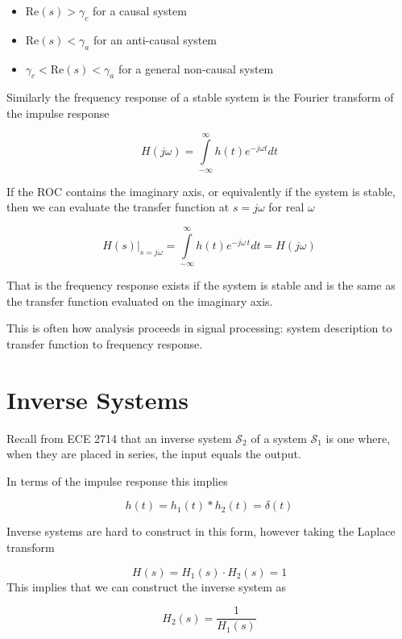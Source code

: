 \documentclass{article}
\begin{document}
\begin{itemize}
\item $\text{Re}(s) > \gamma_c$ for a causal system
\item $\text{Re}(s) < \gamma_a$ for an anti-causal system
\item $\gamma_c < \text{Re}(s) < \gamma_a$ for a general non-causal system 
\end{itemize}

Similarly the frequency response of a stable system is the Fourier transform of the impulse response

$$
H(j\omega) = \int\limits_{-\infty}^{\infty} h(t) e^{-j\omega t} dt
$$

If the ROC contains the imaginary axis, or equivalently if the system is stable, then we can evaluate the transfer function at $s = j\omega$ for real $\omega$

$$
\left. H(s) \right|_{s = j\omega} = \int\limits_{-\infty}^{\infty} h(t) e^{-j\omega\, t} dt = H(j\omega)
$$

That is the frequency response exists if the system is stable and is the same as the transfer function evaluated on the imaginary axis.

This is often how analysis proceeds in signal processing: system description to transfer function to frequency response.

\section{Inverse Systems}

Recall from ECE 2714 that an inverse system $\mathcal{S}_2$ of a system $\mathcal{S}_1$ is one where, when they are placed in series, the input equals the output.

In terms of the impulse response this implies

$$
h(t) = h_1(t) * h_2(t) = \delta(t)
$$

Inverse systems are hard to construct in this form, however taking the Laplace transform

$$
H(s) = H_1(s)\cdot H_2(s) = 1
$$
This implies that we can construct the inverse system as

$$
H_2(s) = \frac{1}{H_1(s)}
$$
\end{document}
